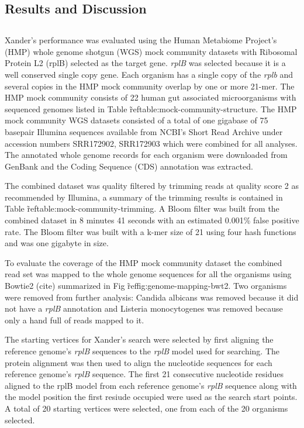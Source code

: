 \documentclass[10pt]{bmc_article}
\newenvironment{bmcformat}{\begin{raggedright}\baselineskip20pt\sloppy\setboolean{publ}{false}}{\end{raggedright}\baselineskip20pt\sloppy}
\begin{document}
\begin{bmcformat}
\section*{Results and Discussion}
\subsection*{}
Xander's performance was evaluated using the Human Metabiome Project's (HMP) whole genome shotgun (WGS) mock community datasets with Ribosomal Protein L2 (rplB) selected as the target gene.  \emph{rplB} was selected because it is a well conserved single copy gene.  Each organism has a single copy of the \emph{rplb} and several copies in the HMP mock community overlap by one or more 21-mer. The HMP mock community consists of 22 human gut associated microorganisms with sequenced genomes listed in Table \~ref{table:mock-community-structure}.  The HMP mock community WGS datasets consisted of a total of one gigabase of 75 basepair Illumina sequences available from NCBI's Short Read Archive under accession numbers SRR172902, SRR172903 which were combined for all analyses.  The annotated whole genome records for each organism were downloaded from GenBank and the Coding Sequence (CDS) annotation was extracted.

The combined dataset was quality filtered by trimming reads at quality score 2 as recommended by Illumina\cite{Mann2009}, a summary of the trimming results is contained in Table \~ref{table:mock-community-trimming}.  A Bloom filter was built from the combined dataset in 8 minutes 41 seconds with an estimated 0.001\% false positive rate.  The Bloom filter was built with a k-mer size of 21 using four hash functions and was one gigabyte in size.

To evaluate the coverage of the HMP mock community dataset the combined read set was mapped to the whole genome sequences for all the organisms using Bowtie2 (cite) summarized in Fig \~ref{fig:genome-mapping-bwt2}.  Two organisms were removed from further analysis: Candida albicans was removed because it did not have a \emph{rplB} annotation and Listeria monocytogenes was removed because only a hand full of reads mapped to it.

The starting vertices for Xander's search were selected by first aligning the reference genome's \emph{rplB} sequences to the \emph{rplB} model used for searching.  The protein alignment was then used to align the nucleotide sequences for each reference genome's \emph{rplB} sequence.  The first 21 consecutive nucleotide residues aligned to the rplB model from each reference genome's \emph{rplB} sequence along with the model position the first resiude occupied were used as the search start points.  A total of 20 starting vertices were selected, one from each of the 20 organisms selected.


\end{bmcformat}
\end{document}
